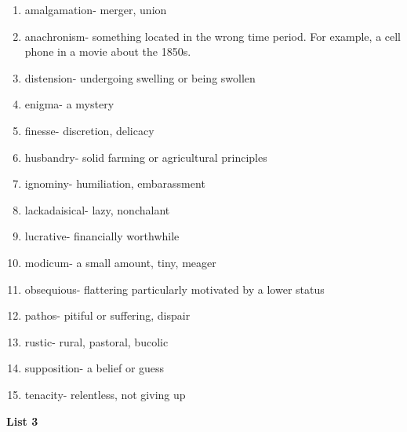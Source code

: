 \begin{enumerate}

\item amalgamation- merger, union

\item anachronism- something located in the wrong time period. For example, a cell phone in a movie about the 1850s. 

\item distension- undergoing swelling or being swollen

\item enigma- a mystery

\item finesse- discretion, delicacy

\item husbandry- solid farming or agricultural principles

\item ignominy- humiliation, embarassment 

\item lackadaisical- lazy, nonchalant 

\item lucrative- financially worthwhile

\item modicum- a small amount, tiny, meager

\item obsequious- flattering particularly motivated by a lower status

\item pathos- pitiful or suffering, dispair

\item rustic- rural, pastoral, bucolic

\item supposition- a belief or guess

\item tenacity- relentless, not giving up

\end{enumerate}

\textbf{List 3}

